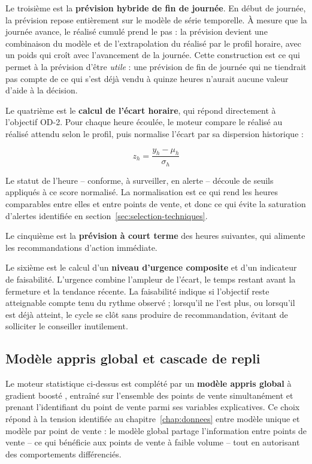 Le troisième est la \textbf{prévision hybride de fin de journée}. En début de journée, la prévision repose entièrement sur le modèle de série temporelle. À mesure que la journée avance, le réalisé cumulé prend le pas : la prévision devient une combinaison du modèle et de l'extrapolation du réalisé par le profil horaire, avec un poids qui croît avec l'avancement de la journée. Cette construction est ce qui permet à la prévision d'être \textit{utile} : une prévision de fin de journée qui ne tiendrait pas compte de ce qui s'est déjà vendu à quinze heures n'aurait aucune valeur d'aide à la décision.

Le quatrième est le \textbf{calcul de l'écart horaire}, qui répond directement à l'objectif OD-2. Pour chaque heure écoulée, le moteur compare le réalisé au réalisé attendu selon le profil, puis normalise l'écart par sa dispersion historique :

\begin{equation}
z_h = \frac{y_h - \mu_h}{\sigma_h}
\end{equation}

Le statut de l'heure -- conforme, à surveiller, en alerte -- découle de seuils appliqués à ce score normalisé. La normalisation est ce qui rend les heures comparables entre elles et entre points de vente, et donc ce qui évite la saturation d'alertes identifiée en section~\ref{sec:selection-techniques}.

Le cinquième est la \textbf{prévision à court terme} des heures suivantes, qui alimente les recommandations d'action immédiate.

Le sixième est le calcul d'un \textbf{niveau d'urgence composite} et d'un indicateur de faisabilité. L'urgence combine l'ampleur de l'écart, le temps restant avant la fermeture et la tendance récente. La faisabilité indique si l'objectif reste atteignable compte tenu du rythme observé ; lorsqu'il ne l'est plus, ou lorsqu'il est déjà atteint, le cycle se clôt sans produire de recommandation, évitant de solliciter le conseiller inutilement.

\subsection{Modèle appris global et cascade de repli}

Le moteur statistique ci-dessus est complété par un \textbf{modèle appris global} à gradient boosté \cite{chen2016xgboost}, entraîné sur l'ensemble des points de vente simultanément et prenant l'identifiant du point de vente parmi ses variables explicatives. Ce choix répond à la tension identifiée au chapitre~\ref{chap:donnees} entre modèle unique et modèle par point de vente : le modèle global partage l'information entre points de vente -- ce qui bénéficie aux points de vente à faible volume -- tout en autorisant des comportements différenciés.

